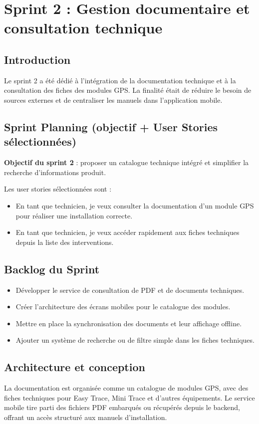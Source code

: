 \documentclass[12pt,a4paper]{report}
\begin{document}
\chapter{Sprint 2 : Gestion documentaire et consultation technique}

\section{Introduction}
\noindent Le sprint 2 a été dédié à l'intégration de la documentation technique et à la consultation des fiches des modules GPS. La finalité était de réduire le besoin de sources externes et de centraliser les manuels dans l'application mobile.

\section{Sprint Planning (objectif + User Stories sélectionnées)}
\noindent \textbf{Objectif du sprint 2} : proposer un catalogue technique intégré et simplifier la recherche d'informations produit.

\noindent Les user stories sélectionnées sont :
\begin{itemize}
    \item En tant que technicien, je veux consulter la documentation d'un module GPS pour réaliser une installation correcte.
    \item En tant que technicien, je veux accéder rapidement aux fiches techniques depuis la liste des interventions.
\end{itemize}

\section{Backlog du Sprint}
\begin{itemize}
    \item Développer le service de consultation de PDF et de documents techniques.
    \item Créer l'architecture des écrans mobiles pour le catalogue des modules.
    \item Mettre en place la synchronisation des documents et leur affichage offline.
    \item Ajouter un système de recherche ou de filtre simple dans les fiches techniques.
\end{itemize}

\section{Architecture et conception}
\noindent La documentation est organisée comme un catalogue de modules GPS, avec des fiches techniques pour Easy Trace, Mini Trace et d'autres équipements. Le service mobile tire parti des fichiers PDF embarqués ou récupérés depuis le backend, offrant un accès structuré aux manuels d'installation.
\end{document}

